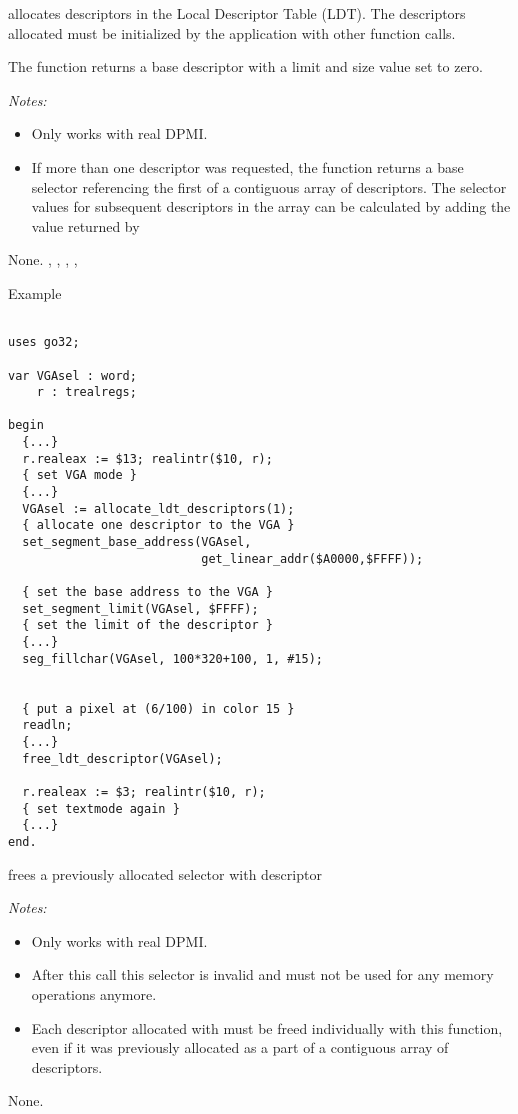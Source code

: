 { allocates  descriptors in the 
Local Descriptor Table (LDT).
The descriptors allocated must be initialized by the application with
other function calls.

The function returns a base descriptor with a limit and size value set to 
zero.

{\em Notes:}
\begin{itemize}
\item Only works with real DPMI.
\item If more than one descriptor was requested, the function returns a base
selector referencing the first of a contiguous array of descriptors. The
selector values for subsequent descriptors in the array can be
calculated by adding the value returned by
\end{itemize}
}{None.}{
,
,
,
,
}
\begin{FPCList}
\item[Example]
\begin{verbatim}

uses go32;

var VGAsel : word;
    r : trealregs;

begin
  {...}
  r.realeax := $13; realintr($10, r); 
  { set VGA mode }
  {...}
  VGAsel := allocate_ldt_descriptors(1); 
  { allocate one descriptor to the VGA }
  set_segment_base_address(VGAsel, 
                           get_linear_addr($A0000,$FFFF)); 

  { set the base address to the VGA }
  set_segment_limit(VGAsel, $FFFF); 
  { set the limit of the descriptor }
  {...}
  seg_fillchar(VGAsel, 100*320+100, 1, #15);


  { put a pixel at (6/100) in color 15 }
  readln;
  {...}
  free_ldt_descriptor(VGAsel);

  r.realeax := $3; realintr($10, r); 
  { set textmode again }
  {...}
end.
\end{verbatim}
\end{FPCList}

{
 frees a previously allocated selector
with descriptor 

{\em Notes:}
\begin{itemize}
\item Only works with real DPMI.
\item After this call this selector is invalid and must not be used for any
memory operations anymore.
\item Each descriptor allocated with  must be 
freed
individually with this function, even if it was previously allocated as
a part of a contiguous array of descriptors.
\end{itemize}
}
{None.}
{}

